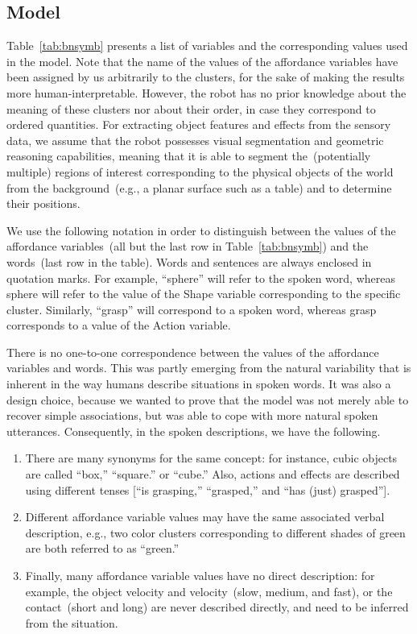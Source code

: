 \subsection{\AffWords{} Model}
Table~\ref{tab:bnsymb} presents a list of variables and the corresponding values used in the \affwords{} model.
Note that the name of the values of the affordance variables have been assigned by us arbitrarily to the clusters, for the sake of making the results more human-interpretable.
However, the robot has no prior knowledge about the meaning of these clusters nor about their order, in case they correspond to ordered quantities.
For extracting object features and effects from the sensory data, we assume that the robot possesses visual segmentation and geometric reasoning capabilities, meaning that it is able to segment the~(potentially multiple) regions of interest corresponding to the physical objects of the world from the background~(e.g., a planar surface such as a table) and to determine their positions.

We use the following notation in order to distinguish between the values of the affordance variables~(all but the last row in Table~\ref{tab:bnsymb}) and the words~(last row in the table).
Words and sentences are always enclosed in quotation marks.
For example, ``sphere'' will refer to the spoken word, whereas sphere will refer to the value of the Shape variable corresponding to the specific cluster.
Similarly, ``grasp'' will correspond to a spoken word, whereas grasp corresponds to a value of the Action variable.

There is no one-to-one correspondence between the values of the affordance variables and words.
This was partly emerging from the natural variability that is inherent in the way humans describe situations in spoken words.
It was also a design choice, because we wanted to prove that the model was not merely able to recover simple \wordmeaning{} associations, but was able to cope with more natural spoken utterances.
Consequently, in the spoken descriptions, we have the following.
\begin{enumerate}
\item There are many synonyms for the same concept: for instance, cubic objects are called ``box,'' ``square.'' or ``cube.''
Also, actions and effects are described using different tenses [``is grasping,'' ``grasped,'' and ``has (just) grasped''].

\item Different affordance variable values may have the same associated verbal description, e.g., two color clusters corresponding to different shades of green are both referred to as ``green.''

\item Finally, many affordance variable values have no direct description: for example, the object velocity and \objecthand{} velocity~(slow, medium, and fast), or the \objecthand{} contact~(short and long) are never described directly, and need to be inferred from the situation.
\end{enumerate}

